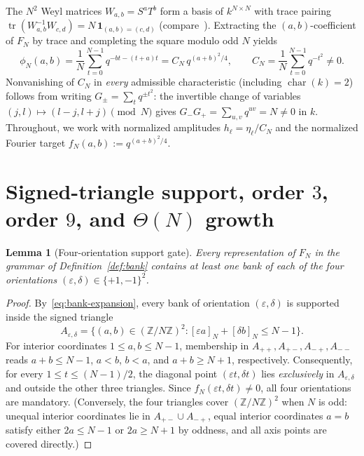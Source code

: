 \documentclass[11pt,reqno]{amsart}
\numberwithin{equation}{section}
\newtheorem{lemma}[theorem]{Lemma}
\theoremstyle{definition}
\theoremstyle{remark}
\newcommand{\Z}{\mathbb{Z}}
\newcommand{\tr}{\operatorname{tr}}
\newcommand{\res}[1]{[#1]_N}
\newcommand{\eps}{\varepsilon}
\begin{document}
The $N^2$ Weyl matrices $W_{a,b} = S^a T^b$ form a basis of $k^{N\times N}$ with trace pairing $\tr(W_{a,b}^{-1}W_{c,d}) = N\,\mathbf{1}_{(a,b)=(c,d)}$ (compare~\cite[Section~II.A--D]{Gro06}). Extracting the $(a,b)$-coefficient of $F_N$ by trace and completing the square modulo odd $N$ yields
\begin{equation}
\label{eq:fourier-weyl}
\phi_N(a,b) = \frac{1}{N}\sum_{t=0}^{N-1} q^{-bt-(t+a)t} = C_N\, q^{(a+b)^2/4},
\qquad C_N = \frac{1}{N}\sum_{t=0}^{N-1} q^{-t^2} \ne 0.
\end{equation}
Nonvanishing of $C_N$ in \emph{every} admissible characteristic (including $\operatorname{char}(k)=2$) follows from writing $G_\pm = \sum_{t} q^{\pm t^2}$: the invertible change of variables $(j,l)\mapsto(l-j,l+j)\pmod N$ gives $G_-G_+ = \sum_{u,v} q^{uv} = N\ne 0$ in $k$. Throughout, we work with normalized amplitudes $h_\ell = \eta_\ell/C_N$ and the normalized Fourier target $f_N(a,b) := q^{(a+b)^2/4}$.

\section{Signed-triangle support, order $3$, order $9$, and $\Theta(N)$ growth}
\label{sec:support-linear}

\begin{lemma}[Four-orientation support gate]
\label{lem:four-orient}
Every representation of $F_N$ in the grammar of Definition~\ref{def:bank} contains at least one bank of each of the four orientations $(\eps,\delta)\in\{+1,-1\}^2$.
\end{lemma}

\begin{proof}
By~\eqref{eq:bank-expansion}, every bank of orientation $(\eps,\delta)$ is supported inside the signed triangle
\[
A_{\eps,\delta} = \bigl\{(a,b)\in(\Z/N\Z)^2 : \res{\eps a} + \res{\delta b} \le N-1\bigr\}.
\]
For interior coordinates $1\le a,b\le N-1$, membership in $A_{++}, A_{+-}, A_{-+}, A_{--}$ reads $a+b\le N-1$, $a<b$, $b<a$, and $a+b\ge N+1$, respectively. Consequently, for every $1\le t\le (N-1)/2$, the diagonal point $(\eps t, \delta t)$ lies \emph{exclusively} in $A_{\eps,\delta}$ and outside the other three triangles. Since $f_N(\eps t, \delta t)\ne 0$, all four orientations are mandatory. (Conversely, the four triangles cover $(\Z/N\Z)^2$ when $N$ is odd: unequal interior coordinates lie in $A_{+-}\cup A_{-+}$, equal interior coordinates $a=b$ satisfy either $2a\le N-1$ or $2a\ge N+1$ by oddness, and all axis points are covered directly.)
\end{proof}
\end{document}
